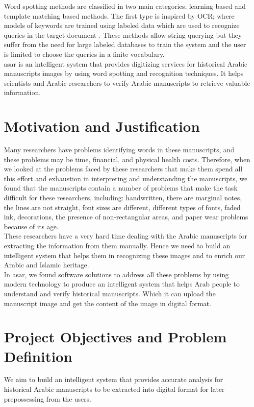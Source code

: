 Word spotting methods are classified in two main categories, learning based and template matching based methods. The first type is inspired by OCR; where models of keywords are trained using labeled data which are used to recognize queries in the target document \cite{GhilasKeyPoints}. These methods allow string querying but they suffer from the need for large labeled databases to train the system and the user is limited to choose the queries in a finite vocabulary. \\

\acrfull{asar} is an intelligent system that provides digitizing services for historical Arabic manuscripts images by using word spotting and recognition techniques. It helps scientists and Arabic researchers to verify Arabic manuscripts to retrieve valuable information.

\section{Motivation and Justification}
Many researchers have problems identifying words in these manuscripts, and these problems may be time, financial, and physical health costs. Therefore, when we looked at the problems faced by these researchers that make them spend all this effort and exhaustion in interpreting and understanding the manuscripts, we found that the manuscripts contain a number of problems that make the task difficult for these researchers, including: handwritten, there are marginal notes, the lines are not straight, font sizes are different, different types of fonts, faded ink, decorations, the presence of non-rectangular areas, and paper wear problems because of its age. \\

\noindent
These researchers have a very hard time dealing with the Arabic manuscripts for extracting the information from them manually. Hence we need to build an intelligent system that helps them in recognizing these images and to enrich our Arabic and Islamic heritage. \\

\noindent
In \acrshort{asar}, we found software solutions to address all these problems by using modern technology to produce an intelligent system that helps Arab people to understand and verify historical manuscripts. Which it can upload the manuscript image and get the content of the image in digital format.


\section{Project Objectives and Problem Definition}
We aim to build an intelligent system that provides accurate analysis for historical Arabic manuscripts to be extracted into digital format for later prepossessing from the users. \\

